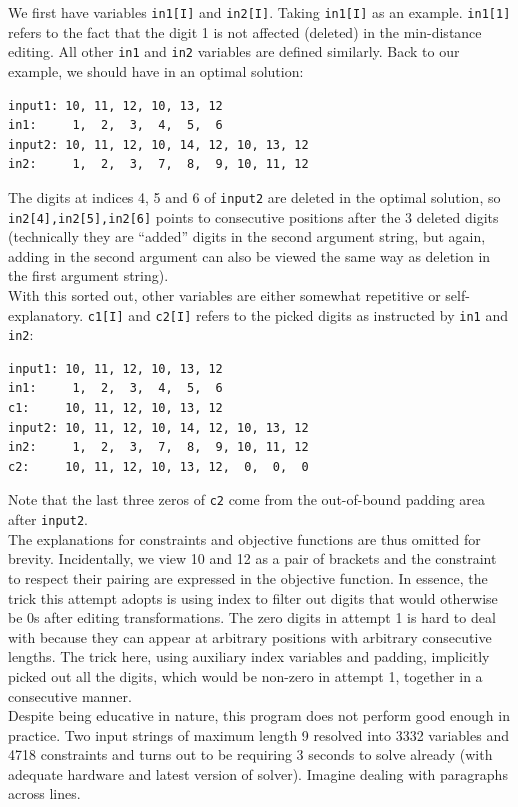 \documentclass{article}
\begin{document}
We first have variables \texttt{in1[I]} and \texttt{in2[I]}. Taking \texttt{in1[I]} as an example. \texttt{in1[1]} refers to the fact that the digit 1 is not affected (deleted) in the min-distance editing. All other \texttt{in1} and \texttt{in2} variables are defined similarly. Back to our example, we should have in an optimal solution:
\begin{lstlisting}
input1: 10, 11, 12, 10, 13, 12
in1:     1,  2,  3,  4,  5,  6
input2: 10, 11, 12, 10, 14, 12, 10, 13, 12
in2:     1,  2,  3,  7,  8,  9, 10, 11, 12 
\end{lstlisting}
The digits at indices 4, 5 and 6 of \texttt{input2} are deleted in the optimal solution, so \texttt{in2[4],in2[5],in2[6]} points to consecutive positions after the 3 deleted digits (technically they are ``added'' digits in the second argument string, but again, adding in the second argument can also be viewed the same way as deletion in the first argument string). \\

With this sorted out, other variables are either somewhat repetitive or self-explanatory. \texttt{c1[I]} and \texttt{c2[I]} refers to the picked digits as instructed by \texttt{in1} and \texttt{in2}:
\begin{lstlisting}
input1: 10, 11, 12, 10, 13, 12
in1:     1,  2,  3,  4,  5,  6
c1:     10, 11, 12, 10, 13, 12
input2: 10, 11, 12, 10, 14, 12, 10, 13, 12
in2:     1,  2,  3,  7,  8,  9, 10, 11, 12 
c2:     10, 11, 12, 10, 13, 12,  0,  0,  0
\end{lstlisting}
Note that the last three zeros of \texttt{c2} come from the out-of-bound padding area after \texttt{input2}. \\

The explanations for constraints and objective functions are thus omitted for brevity. Incidentally, we view 10 and 12 as a pair of brackets and the constraint to respect their pairing are expressed in the objective function. In essence, the trick this attempt adopts is using index to filter out digits that would otherwise be 0s after editing transformations. The zero digits in attempt 1 is hard to deal with because they can appear at arbitrary positions with arbitrary consecutive lengths. The trick here, using auxiliary index variables and padding, implicitly picked out all the digits, which would be non-zero in attempt 1, together in a consecutive manner. \\

Despite being educative in nature, this program does not perform good enough in practice. Two input strings of maximum length 9 resolved into 3332 variables and 4718 constraints and turns out to be requiring 3 seconds to solve already (with adequate hardware and latest version of solver). Imagine dealing with paragraphs across lines. \\
\end{document}
